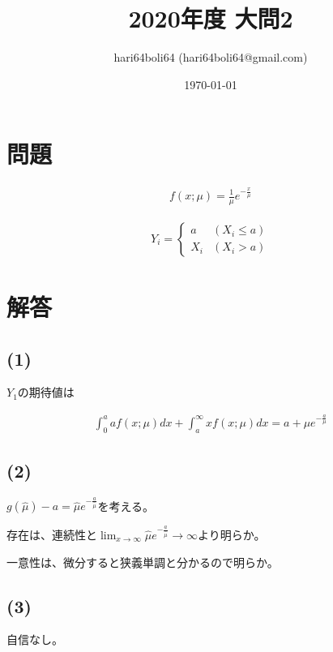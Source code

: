 \documentclass[a4paper, 10pt, dvipdfmx]{jlreq}
\begin{document}
\title{2020年度 大問2}
\author{hari64boli64 (hari64boli64@gmail.com)}
\date{\today}
\maketitle


\section{問題}

\begin{align*}
  f(x;\mu)=\frac{1}{\mu}e^{-\frac{x}{\mu}}
\end{align*}

\begin{align*}
  Y_i= \left\{
  \begin{array}{ll}
    a   & (X_i \leq a) \\
    X_i & (X_i > a)
  \end{array}
  \right.
\end{align*}

\section{解答}

\subsection*{(1)}

$Y_1$の期待値は

\begin{align*}
  \int_0^a af(x;\mu)dx + \int_a^\infty xf(x;\mu)dx=a+\mu e^{-\frac{a}{\mu}}
\end{align*}

\subsection*{(2)}

$g(\hat{\mu})-a=\hat{\mu}e^{-\frac{a}{\hat{\mu}}}$を考える。

存在は、連続性と$\lim_{x \to \infty}\hat{\mu}e^{-\frac{a}{\hat{\mu}}} \to \infty$より明らか。

一意性は、微分すると狭義単調と分かるので明らか。

\subsection*{(3)}

自信なし。
\end{document}
